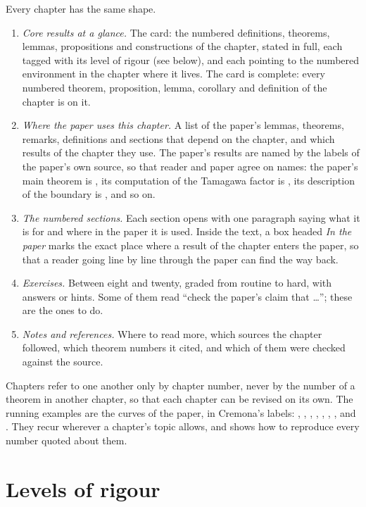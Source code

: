 Every chapter has the same shape.
\begin{enumerate}
\item \emph{Core results at a glance.} The card: the numbered definitions, theorems, lemmas,
propositions and constructions of the chapter, stated in full, each tagged with its level of
rigour (see below), and each pointing to the numbered environment in the chapter where it lives.
The card is complete: every numbered theorem, proposition, lemma, corollary and definition of the
chapter is on it.
\item \emph{Where the paper uses this chapter.} A list of the paper's lemmas, theorems, remarks,
definitions and sections that depend on the chapter, and which results of the chapter they use.
The paper's results are named by the labels of the paper's own source, so that reader and paper
agree on names: the paper's main theorem is , its computation of the
Tamagawa factor is , its description of the boundary is
, and so on.
\item \emph{The numbered sections.} Each section opens with one paragraph saying what it is for
and where in the paper it is used. Inside the text, a box headed \emph{In the paper} marks the
exact place where a result of the chapter enters the paper, so that a reader going line by line
through the paper can find the way back.
\item \emph{Exercises.} Between eight and twenty, graded from routine to hard, with answers or
hints. Some of them read ``check the paper's claim that \ldots''; these are the ones to do.
\item \emph{Notes and references.} Where to read more, which sources the chapter followed, which
theorem numbers it cited, and which of them were checked against the source.
\end{enumerate}
Chapters refer to one another only by chapter number, never by the number of a theorem in another
chapter, so that each chapter can be revised on its own. The running examples are the curves of
the paper, in Cremona's labels: , , , ,
, , ,  and . They recur wherever a
chapter's topic allows, and  shows how to reproduce every number quoted about
them.

\section*{Levels of rigour}

